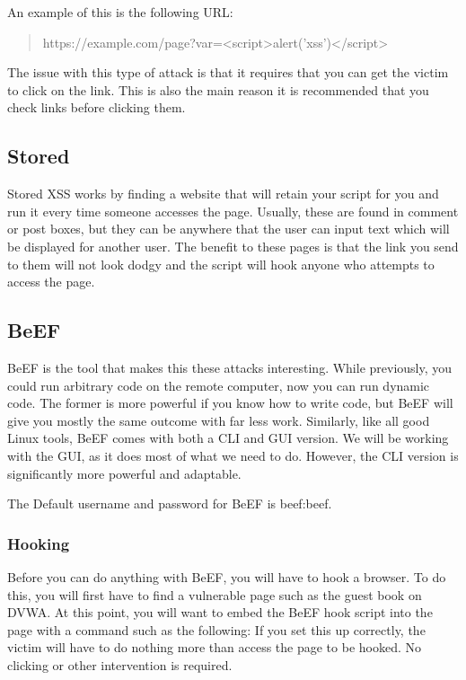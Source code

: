 			An example of this is the following URL:
			\begin{quote}
				https://example.com/page?var=<script>alert('xss')</script>
			\end{quote}

			The issue with this type of attack is that it requires that you can get the victim to click on the link.
			This is also the main reason it is recommended that you check links before clicking them.
		\subsection{Stored}
			Stored XSS works by finding a website that will retain your script for you and run it every time someone accesses the page.
			Usually, these are found in comment or post boxes, but they can be anywhere that the user can input text which will be displayed for another user.
			The benefit to these pages is that the link you send to them will not look dodgy and the script will hook anyone who attempts to access the page.
		\subsection{BeEF}
			BeEF is the tool that makes this these attacks interesting.
			While previously, you could run arbitrary code on the remote computer, now you can run dynamic code.
			The former is more powerful if you know how to write code, but BeEF will give you mostly the same outcome with far less work.
			Similarly, like all good Linux tools, BeEF comes with both a CLI and GUI version.
			We will be working with the GUI, as it does most of what we need to do.
			However, the CLI version is significantly more powerful and adaptable.

			The Default username and password for BeEF is beef:beef.
			\subsubsection{Hooking}
				Before you can do anything with BeEF, you will have to hook a browser.
				To do this, you will first have to find a vulnerable page such as the guest book on DVWA.
				At this point, you will want to embed the BeEF hook script into the page with a command such as the following:
				If you set this up correctly, the victim will have to do nothing more than access the page to be hooked.
				No clicking or other intervention is required.
